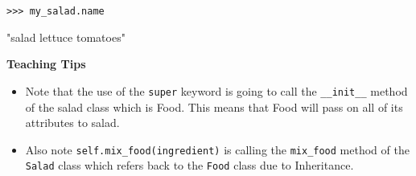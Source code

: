 \begin{lstlisting}
>>> my_salad.name
\end{lstlisting}
\begin{solution}[.3in]
"salad lettuce tomatoes"
\end{solution}

\begin{guide}
\textbf{Teaching Tips}
\begin{itemize}
    \item Note that the use of the \lstinline{super} keyword is going to call the \lstinline{__init__} method of the salad class which is Food. This means that Food will pass on all of its attributes to salad.
    \item Also note \lstinline{self.mix_food(ingredient)} is calling the \lstinline{mix_food} method of the \lstinline{Salad} class which refers back to the \lstinline{Food} class due to Inheritance.
\end{itemize}
\end{guide}